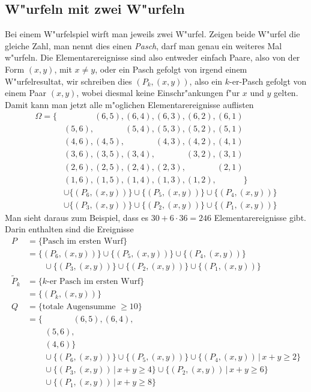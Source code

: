 \subsection{W"urfeln mit zwei W"urfeln}
Bei einem W"urfelspiel wirft man jeweils zwei W"urfel. Zeigen beide W"urfel
die gleiche Zahl, man nennt dies einen {\em Pasch}, darf man genau ein
weiteres Mal w"urfeln.
Die Elementarereignisse sind also entweder einfach Paare, also von
der Form $(x,y)$, mit $x\ne y$, oder ein Pasch gefolgt von irgend einem
W"urfelresultat, wir schreiben dies $(P_k, (x,y))$, also ein $k$-er-Pasch
gefolgt von einem Paar $(x,y)$, wobei diesmal keine Einschr"ankungen f"ur
$x$ und $y$ gelten.
Damit kann man jetzt alle m"oglichen Elementarereignisse auflisten
\begin{align*}
\Omega=\{
&\phantom{(6,6),} (6,5), (6,4), (6,3), (6,2), (6,1)\\
&(5,6), \phantom{(5,5),} (5,4), (5,3), (5,2), (5,1)\\
&(4,6), (4,5), \phantom{(4,4),} (4,3), (4,2), (4,1)\\
&(3,6), (3,5), (3,4), \phantom{(3,3),} (3,2), (3,1)\\
&(2,6), (2,5), (2,4), (2,3), \phantom{(2,2),} (2,1)\\
&(1,6), (1,5), (1,4), (1,3), (1,2), \phantom{(1,1)}
\}
\\
&\cup
\{(P_6,(x,y))\}
\cup
\{(P_5,(x,y))\}
\cup
\{(P_4,(x,y))\}
\\
&\cup
\{(P_3,(x,y))\}
\cup
\{(P_2,(x,y))\}
\cup
\{(P_1,(x,y))\}
\end{align*}
Man sieht daraus zum Beispiel, dass es $30 + 6\cdot 36=246$
Elementarereignisse gibt. Darin enthalten sind die Ereignisse
\begin{align*}
P&=\{\text{Pasch im ersten Wurf}\}\\
&=
\{(P_6,(x,y))\}
\cup
\{(P_5,(x,y))\}
\cup
\{(P_4,(x,y))\}
\\
&\qquad \cup
\{(P_3,(x,y))\}
\cup
\{(P_2,(x,y))\}
\cup
\{(P_1,(x,y))\}
\\
\tilde P_k&=\{\text{$k$-er Pasch im ersten Wurf}\}\\
   &=\{(P_k,(x,y))\}
\\
Q&=\{\text{totale Augensumme $\ge 10$}\}\\
&=\{\phantom{(6,6),} (6,5), (6,4), \\
&\phantom{\;=\{}(5,6), \phantom{(5,5),} \\
&\phantom{\;=\{}(4,6)
\}
\\
&\qquad\cup
\{(P_6,(x,y))\}
\cup
\{(P_5,(x,y))\}
\cup
\{(P_4,(x,y))\,|\, x+y \ge 2\}
\\
&\qquad\cup
\{(P_3,(x,y))\,|\, x+y \ge 4\}
\cup
\{(P_2,(x,y))\,|\, x+y \ge 6\}
\\
&\qquad
\cup
\{(P_1,(x,y))\,|\, x+y \ge 8\}
\end{align*}

